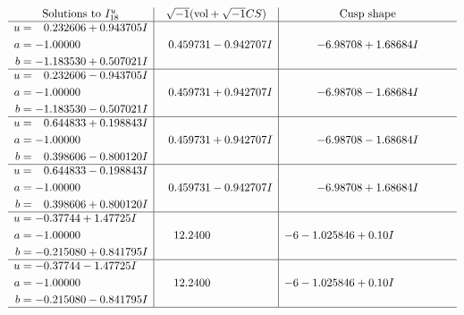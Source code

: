 \documentclass[1p]{elsarticle_modified}
\theoremstyle{definition}
\newcommand{\I}{\sqrt{-1}}
\begin{document}
$$\begin{array}{c|c|c}  
\text{Solutions to }I^u_{18}& \I (\text{vol} + \sqrt{-1}CS) & \text{Cusp shape}\\
 \hline 
\begin{aligned}
u &= \phantom{-}0.232606 + 0.943705 I \\
a &= -1.00000\phantom{ +0.000000I} \\
b &= -1.183530 + 0.507021 I\end{aligned}
 & \phantom{-}0.459731 - 0.942707 I & -6.98708 + 1.68684 I \\ \hline\begin{aligned}
u &= \phantom{-}0.232606 - 0.943705 I \\
a &= -1.00000\phantom{ +0.000000I} \\
b &= -1.183530 - 0.507021 I\end{aligned}
 & \phantom{-}0.459731 + 0.942707 I & -6.98708 - 1.68684 I \\ \hline\begin{aligned}
u &= \phantom{-}0.644833 + 0.198843 I \\
a &= -1.00000\phantom{ +0.000000I} \\
b &= \phantom{-}0.398606 - 0.800120 I\end{aligned}
 & \phantom{-}0.459731 + 0.942707 I & -6.98708 - 1.68684 I \\ \hline\begin{aligned}
u &= \phantom{-}0.644833 - 0.198843 I \\
a &= -1.00000\phantom{ +0.000000I} \\
b &= \phantom{-}0.398606 + 0.800120 I\end{aligned}
 & \phantom{-}0.459731 - 0.942707 I & -6.98708 + 1.68684 I \\ \hline\begin{aligned}
u &= -0.37744 + 1.47725 I \\
a &= -1.00000\phantom{ +0.000000I} \\
b &= -0.215080 + 0.841795 I\end{aligned}
 & \phantom{-}12.2400\phantom{ +0.000000I} &                  -6
-1.025846 + 0. 10   I\phantom{ +0.000000I} \\ \hline\begin{aligned}
u &= -0.37744 - 1.47725 I \\
a &= -1.00000\phantom{ +0.000000I} \\
b &= -0.215080 - 0.841795 I\end{aligned}
 & \phantom{-}12.2400\phantom{ +0.000000I} &                  -6
-1.025846 + 0. 10   I\phantom{ +0.000000I}\\
 \hline 
 \end{array}$$\newpage\newpage\renewcommand{\arraystretch}{1}
\end{document}
